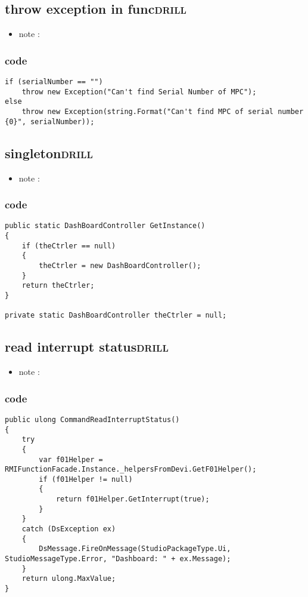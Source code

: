 \documentclass[11pt]{article}
\begin{document}
\subsection{throw exception in func\hfill{}\textsc{drill}}
\label{sec:org8a8bf04}
\begin{itemize}
\item note :
\end{itemize}
\subsubsection{code}
\label{sec:org2b2b7c2}
\begin{verbatim}
if (serialNumber == "")
    throw new Exception("Can't find Serial Number of MPC");
else
    throw new Exception(string.Format("Can't find MPC of serial number {0}", serialNumber));

\end{verbatim}

\subsection{singleton\hfill{}\textsc{drill}}
\label{sec:orgbfc4b57}
\begin{itemize}
\item note :
\end{itemize}
\subsubsection{code}
\label{sec:org39dcb01}
\begin{verbatim}
public static DashBoardController GetInstance()
{
    if (theCtrler == null)
    {
        theCtrler = new DashBoardController();
    }
    return theCtrler;
}

private static DashBoardController theCtrler = null;

\end{verbatim}

\subsection{read interrupt status\hfill{}\textsc{drill}}
\label{sec:org99a64af}
\begin{itemize}
\item note :
\end{itemize}
\subsubsection{code}
\label{sec:org183e090}
\begin{verbatim}
public ulong CommandReadInterruptStatus()
{
    try
    {
        var f01Helper = RMIFunctionFacade.Instance._helpersFromDevi.GetF01Helper();
        if (f01Helper != null)
        {
            return f01Helper.GetInterrupt(true);
        }
    }
    catch (DsException ex)
    {
        DsMessage.FireOnMessage(StudioPackageType.Ui, StudioMessageType.Error, "Dashboard: " + ex.Message);
    }
    return ulong.MaxValue;
}

\end{verbatim}
\end{document}
